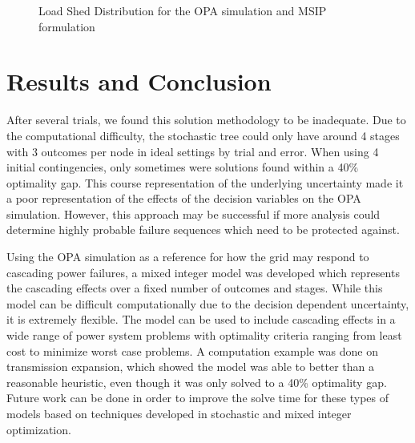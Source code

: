\begin{figure}
 \centering
  \caption{Load Shed Distribution for the OPA simulation and MSIP formulation}
 \label{dist}
\end{figure}


\section{Results and Conclusion}
After several trials, we found this solution methodology to be inadequate.  Due to the computational difficulty, the stochastic tree could only have around 4 stages with 3 outcomes per node in ideal settings by trial and error.  When using 4 initial contingencies, only sometimes were solutions found within a 40\% optimality gap.  This course representation of the underlying uncertainty made it a poor representation of the effects of the decision variables on the OPA simulation.  However, this approach may be successful if more analysis could determine highly probable failure sequences which need to be protected against.

Using the OPA simulation as a reference for how the grid may respond to cascading power failures, a mixed integer model was developed which represents the cascading effects over a fixed number of outcomes and stages.  While this model can be difficult computationally due to the decision dependent uncertainty, it is extremely flexible.  The model can be used to include cascading effects in a wide range of power system problems with optimality criteria ranging from least cost to minimize worst case problems.  A computation example was done on transmission expansion, which showed the model was able to better than a reasonable heuristic, even though it was only solved to a 40\% optimality gap.  Future work can be done in order to improve the solve time for these types of models based on techniques developed in stochastic and mixed integer optimization.


